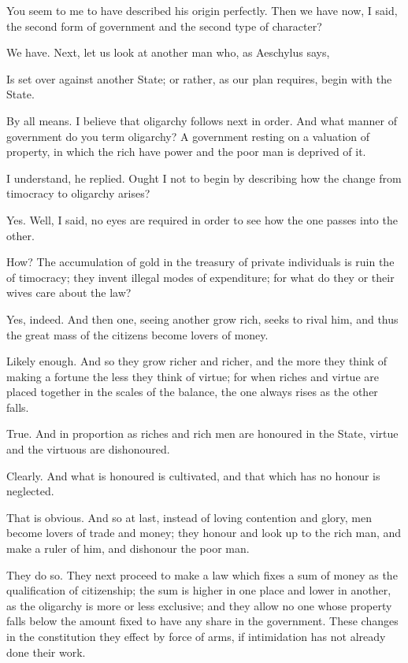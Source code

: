 You seem to me to have described his origin perfectly.
Then we have now, I said, the second form of government and the second type of character?

We have.
Next, let us look at another man who, as Aeschylus says,

Is set over against another State; or rather, as our plan requires, begin with the State.

By all means.
I believe that oligarchy follows next in order.
And what manner of government do you term oligarchy?
A government resting on a valuation of property, in which the rich have power and the poor man is deprived of it.

I understand, he replied.
Ought I not to begin by describing how the change from timocracy to oligarchy arises?

Yes.
Well, I said, no eyes are required in order to see how the one passes into the other.

How?
The accumulation of gold in the treasury of private individuals is ruin the of timocracy; they invent illegal modes of expenditure; for what do they or their wives care about the law?

Yes, indeed.
And then one, seeing another grow rich, seeks to rival him, and thus the great mass of the citizens become lovers of money.

Likely enough.
And so they grow richer and richer, and the more they think of making a fortune the less they think of virtue; for when riches and virtue are placed together in the scales of the balance, the one always rises as the other falls.

True.
And in proportion as riches and rich men are honoured in the State, virtue and the virtuous are dishonoured.

Clearly.
And what is honoured is cultivated, and that which has no honour is neglected.

That is obvious.
And so at last, instead of loving contention and glory, men become lovers of trade and money; they honour and look up to the rich man, and make a ruler of him, and dishonour the poor man.

They do so.
They next proceed to make a law which fixes a sum of money as the qualification of citizenship; the sum is higher in one place and lower in another, as the oligarchy is more or less exclusive; and they allow no one whose property falls below the amount fixed to have any share in the government. These changes in the constitution they effect by force of arms, if intimidation has not already done their work.

